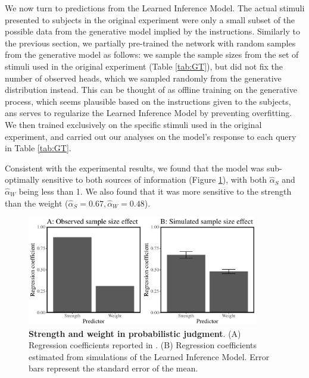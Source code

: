 We now turn to predictions from the Learned Inference Model. The actual stimuli presented to subjects in the original experiment were only a small subset of the possible data from the generative model implied by the instructions. Similarly to the previous section, we partially pre-trained the network with random samples from the generative model as follows: we sample the sample sizes from the set of stimuli used in the original experiment (Table \ref{tab:GT}), but did not fix the number of observed heads, which we sampled randomly from the generative distribution instead. This can be thought of as offline training on the generative process, which seems plausible based on the instructions given to the subjects, ans serves to regularize the Learned Inference Model by preventing overfitting. We then trained exclusively on the specific stimuli used in the original experiment, and carried out our analyses on the model's response to each query in Table \ref{tab:GT}.

Consistent with the experimental results, we found that the model was sub-optimally sensitive to both sources of information (Figure \ref{fig:samplesize}), with both $\hat{\alpha}_S$ and $\hat{\alpha}_W$ being less than 1. We also found that it was more sensitive to the strength than the weight ($\hat{\alpha}_{S} = 0.67, \hat{\alpha}_{W} = 0.48$).

\begin{figure}
    \centering
    \includegraphics[width=0.9\textwidth]{figures/GT_fulltrain.pdf}
    \caption{\textbf{Strength and weight in probabilistic judgment}. (A) Regression coefficients reported in \cite{griffin1992weighing}. (B) Regression coefficients estimated from simulations of the Learned Inference Model. Error bars represent the standard error of the mean.}
    \label{fig:samplesize}
\end{figure}

